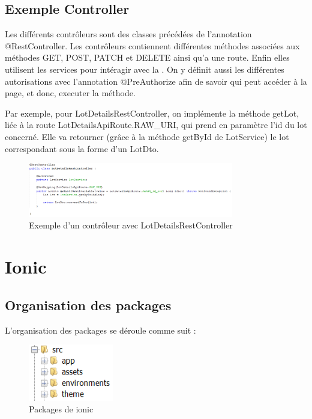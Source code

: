 		\subsection{Exemple Controller}

			Les différents contrôleurs sont des classes précédées de l'annotation @RestController. \newline
			Les contrôleurs contiennent différentes méthodes associées aux méthodes GET, POST, PATCH et DELETE ainsi qu'a une route. Enfin elles utilisent les services pour intéragir avec la \bdd{}. On y définit aussi les différentes autorisations avec l'annotation @PreAuthorize afin de savoir qui peut accéder à la page, et donc, executer la méthode.

			\noindent
			Par exemple, pour LotDetailsRestController, on implémente la méthode getLot, liée à la route LotDetailsApiRoute.RAW\_URI, qui prend en paramètre l'id du lot concerné. Elle va retourner (grâce à la méthode getById de LotService) le lot correspondant sous la forme d'un LotDto.

			\begin{figure}[H]
				\centering\includegraphics[width=0.80\textwidth, keepaspectratio]{res/lotsController.png}
				\caption{Exemple d'un contrôleur avec LotDetailsRestController}
			\end{figure}


	\section{Ionic}

		\subsection{Organisation des packages}

			L'organisation des packages se déroule comme suit :

			\begin{figure}[H]
				\centering\includegraphics[width=0.33\textwidth, keepaspectratio]{res/ionicPackage.png}
				\caption{Packages de ionic}
			\end{figure}

